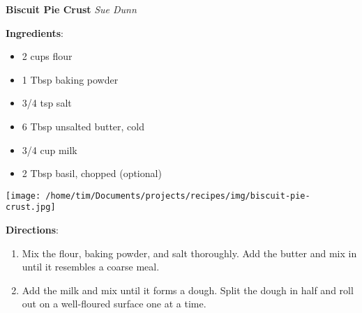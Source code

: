 \documentclass[11pt, twoside, openany]{book}
\begin{document}
\noindent\begin{minipage}[t]{\linewidth}%
{\Large\textbf{Biscuit Pie Crust}} \label{biscuit-pie-crust}\hfill\textit{Sue Dunn}\\
\noindent\begin{minipage}[t]{0.78\linewidth}%
\textbf{Ingredients}:\vspace{-3mm}
\begin{multicols}{2}
\begin{itemize}\setlength\itemsep{-1mm}
\item 2 cups flour
\item 1 Tbsp baking powder
\item 3/4 tsp salt
\item 6 Tbsp unsalted butter, cold
\item 3/4 cup milk
\item 2 Tbsp basil, chopped (optional)
\end{itemize}
\end{multicols}
\end{minipage}
\noindent\begin{minipage}[t]{0.18\linewidth}
\centering \strut\vspace*{-\baselineskip}\newline
\texttt{[image: /home/tim/Documents/projects/recipes/img/biscuit-pie-crust.jpg]}\\
\end{minipage}\vspace{3mm}
\textbf{Directions}:
\vspace{-3mm}\begin{enumerate}\setlength\itemsep{-1mm}
\item Mix the flour, baking powder, and salt thoroughly. Add the butter and mix in until it resembles a coarse meal.
\item Add the milk and mix until it forms a dough. Split the dough in half and roll out on a well-floured surface one at a time.
\end{enumerate}
\end{minipage}\vspace{8mm}
\end{document}
